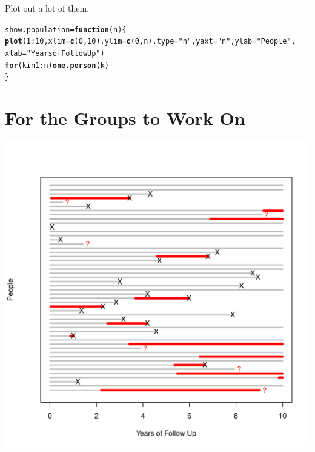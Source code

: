 \documentclass{article}\usepackage{graphicx, color}
\makeatletter
\newcommand{\hlfunctioncall}[1]{\textcolor[rgb]{0.501960784313725,0,0.329411764705882}{\textbf{#1}}}%
\newcommand{\hlstring}[1]{\textcolor[rgb]{0.6,0.6,1}{#1}}%
\newenvironment{kframe}{%
 \def\at@end@of@kframe{}%
 \ifinner\ifhmode%
  \def\at@end@of@kframe{\end{minipage}}%
  \begin{minipage}{\columnwidth}%
 \fi\fi%
 \def\FrameCommand##1{\hskip\@totalleftmargin \hskip-\fboxsep
 \colorbox{shadecolor}{##1}\hskip-\fboxsep
     \hskip-\linewidth \hskip-\@totalleftmargin \hskip\columnwidth}%
 \MakeFramed {\advance\hsize-\width
   \@totalleftmargin\z@ \linewidth\hsize
   \@setminipage}}%
 {\par\unskip\endMakeFramed%
 \at@end@of@kframe}
\newenvironment{knitrout}{}{} %
\makeatother
\begin{document}
Plot out a lot of them.
\begin{knitrout}
\color{fgcolor}\begin{kframe}
\begin{alltt}
show.population = \hlfunctioncall{function}(n) \{
    \hlfunctioncall{plot}(1:10, xlim = \hlfunctioncall{c}(0, 10), ylim = \hlfunctioncall{c}(0, n), type = \hlstring{"n"}, yaxt = \hlstring{"n"}, ylab = \hlstring{"People"}, 
        xlab = \hlstring{"Years of Follow Up"})
    \hlfunctioncall{for} (k in 1:n) \hlfunctioncall{one.person}(k)
\}
\end{alltt}
\end{kframe}
\end{knitrout}


\section{For the Groups to Work On}

\begin{knitrout}
\color{fgcolor}\includegraphics[width=6in]{figure/one} 
\end{knitrout}
\end{document}
